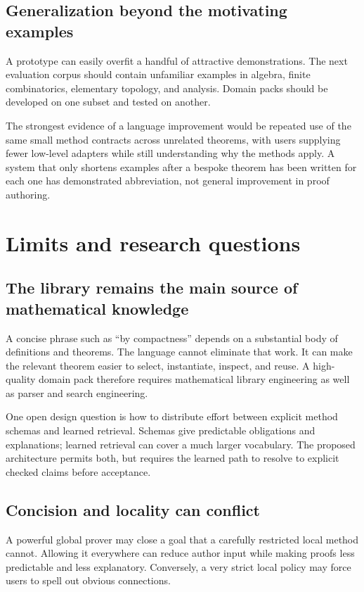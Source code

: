 \documentclass[11pt,a4paper]{article}
\theoremstyle{remark}
\begin{document}
\subsection{Generalization beyond the motivating examples}
A prototype can easily overfit a handful of attractive demonstrations. The next evaluation corpus should contain unfamiliar examples in algebra, finite combinatorics, elementary topology, and analysis. Domain packs should be developed on one subset and tested on another.

The strongest evidence of a language improvement would be repeated use of the same small method contracts across unrelated theorems, with users supplying fewer low-level adapters while still understanding why the methods apply. A system that only shortens examples after a bespoke theorem has been written for each one has demonstrated abbreviation, not general improvement in proof authoring.

\section{Limits and research questions}\label{sec:limits}

\subsection{The library remains the main source of mathematical knowledge}
A concise phrase such as ``by compactness'' depends on a substantial body of definitions and theorems. The language cannot eliminate that work. It can make the relevant theorem easier to select, instantiate, inspect, and reuse. A high-quality domain pack therefore requires mathematical library engineering as well as parser and search engineering.

One open design question is how to distribute effort between explicit method schemas and learned retrieval. Schemas give predictable obligations and explanations; learned retrieval can cover a much larger vocabulary. The proposed architecture permits both, but requires the learned path to resolve to explicit checked claims before acceptance.

\subsection{Concision and locality can conflict}
A powerful global prover may close a goal that a carefully restricted local method cannot. Allowing it everywhere can reduce author input while making proofs less predictable and less explanatory. Conversely, a very strict local policy may force users to spell out obvious connections.
\end{document}
